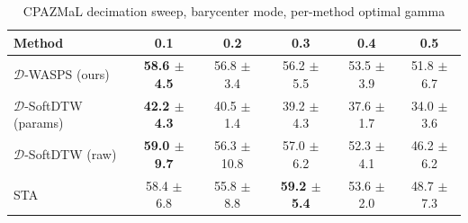 \begin{table}[htbp]
\centering
\begin{NiceTabular}{lccccc}
\toprule
Method & 0.1 & 0.2 & 0.3 & 0.4 & 0.5 \\
\midrule
$\mathcal{D}$-WASPS (ours) & \textbf{58.6 $\pm$ 4.5} & 56.8 $\pm$ 3.4 & 56.2 $\pm$ 5.5 & 53.5 $\pm$ 3.9 & 51.8 $\pm$ 6.7 \\
$\mathcal{D}$-SoftDTW (params) & \textbf{42.2 $\pm$ 4.3} & 40.5 $\pm$ 1.4 & 39.2 $\pm$ 4.3 & 37.6 $\pm$ 1.7 & 34.0 $\pm$ 3.6 \\
$\mathcal{D}$-SoftDTW (raw) & \textbf{59.0 $\pm$ 9.7} & 56.3 $\pm$ 10.8 & 57.0 $\pm$ 6.2 & 52.3 $\pm$ 4.1 & 46.2 $\pm$ 6.2 \\
STA~\cite{janati2020spatio} & 58.4 $\pm$ 6.8 & 55.8 $\pm$ 8.8 & \textbf{59.2 $\pm$ 5.4} & 53.6 $\pm$ 2.0 & 48.7 $\pm$ 7.3 \\
\bottomrule
\end{NiceTabular}
\caption{CPAZMaL decimation sweep, barycenter mode, per-method optimal gamma}
\label{tab:exp3_decimation}
\end{table}
